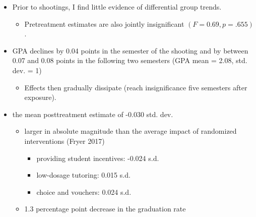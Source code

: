 \documentclass[dvipdfmx]{beamer}
\begin{document}
\begin{frame}{}
  \begin{itemize}
    \item Prior to shootings, I find little evidence of differential group trends.
    \begin{itemize}
      \item Pretreatment estimates are also jointly insignificant $(F = 0.69, p = .655)$.
    \end{itemize}
    \item GPA declines by 0.04 points in the semester of the shooting and by between 0.07 and 0.08 points in the following two semesters (GPA mean = 2.08, std. dev. = 1)
    \begin{itemize}
      \item Effects then gradually dissipate (reach insignificance five semesters after exposure).
    \end{itemize}
    \item the mean posttreatment estimate of -0.030 std. dev.
    \begin{itemize}
      \item larger in absolute magnitude than the average impact of randomized interventions (Fryer 2017)
      \begin{itemize}
        \item providing student incentives: -0.024 s.d.
        \item low-dosage tutoring: 0.015 s.d.
        \item choice and vouchers: 0.024 s.d.
      \end{itemize}
      \item 1.3 percentage point decrease in the graduation rate
    \end{itemize}
  \end{itemize}
\end{frame}
\end{document}

